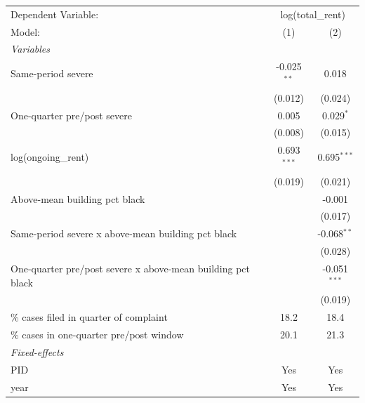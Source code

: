 \begingroup
\centering
\begin{tabular}{lcc}
   \tabularnewline \midrule \midrule
   Dependent Variable: & \multicolumn{2}{c}{log(total\_rent)}\\
   Model:                                                      & (1)           & (2)\\  
   \midrule
   \emph{Variables}\\
   Same-period severe                                          & -0.025$^{**}$ & 0.018\\   
                                                               & (0.012)       & (0.024)\\   
   One-quarter pre/post severe                                 & 0.005         & 0.029$^{*}$\\   
                                                               & (0.008)       & (0.015)\\   
   log(ongoing\_rent)                                          & 0.693$^{***}$ & 0.695$^{***}$\\   
                                                               & (0.019)       & (0.021)\\   
   Above-mean building pct black                               &               & -0.001\\   
                                                               &               & (0.017)\\   
   Same-period severe x above-mean building pct black          &               & -0.068$^{**}$\\   
                                                               &               & (0.028)\\   
   One-quarter pre/post severe x above-mean building pct black &               & -0.051$^{***}$\\   
                                                               &               & (0.019)\\   
   \% cases filed in quarter of complaint                      & 18.2          & 18.4\\  
   \% cases in one-quarter pre/post window                     & 20.1          & 21.3\\  
   \midrule
   \emph{Fixed-effects}\\
   PID                                                         & Yes           & Yes\\  
   year                                                        & Yes           & Yes\\  

\end{tabular}
